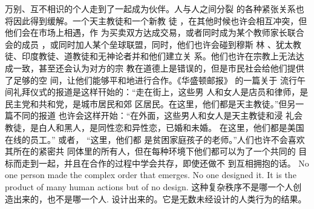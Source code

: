 \begin{paracol}{2}
万别、互不相识的个人走到了一起成为伙伴。人与人之间分裂
的各种紧张关系也将因此得到缓解。一个天主教徒和一个新教
徒 ，在其他时候也许会相互冲突，但他们会在市场上相遇，作
为买卖双方达成交易，或者同时成为某个教师家长联合会的成员 ，或同时加人某个垒球联盟，同时，他们也许会碰到穆斯
林 、犹太教徒、印度教徒、道教徒和无神论者并和他们建立关
系。他们也许在宗教上无法达成一致，甚至还会认为对方的宗
教在道德上是错误的，但是市民社会给他们提供了足够的空
间，让他们能够平和地进行合作。《华盛顿邮报》 的一篇关于
流行午间礼拜仪式的报道是这样幵始的：“走在街上，这些男
人和女人是店员和律师，是民主党和共和党，是城市居民和郊
区居民。在这里，他们都是天主教徒。”但另一篇不同的报道
也许会这样开始：“在外面，这些男人和女人是天主教徒和浸
礼会教徒，是白人和黑人，是同性恋和异性恋，已婚和未婚。
在这里，他们都是美国在线的员工。” 或者， “这里，他们都
是贫困家庭孩子的老师。”人们也许不会喜欢其所在的紧密共
同体里的所有人，但在每种环境下他们都可以为了一个共同的
目标而走到一起，并且在合作的过程中学会共存，即使还做不
到互相拥抱的话。
\switchcolumn*
No one person made the complex order that emerges. No
one designed it. It is the product of many human actions but of
no design.
\switchcolumn
这种复杂秩序不是哪一个人创造出来的，也不是哪一个人.
设计出来的。它是无数未经设计的人类行为的结果。


\end{paracol}
